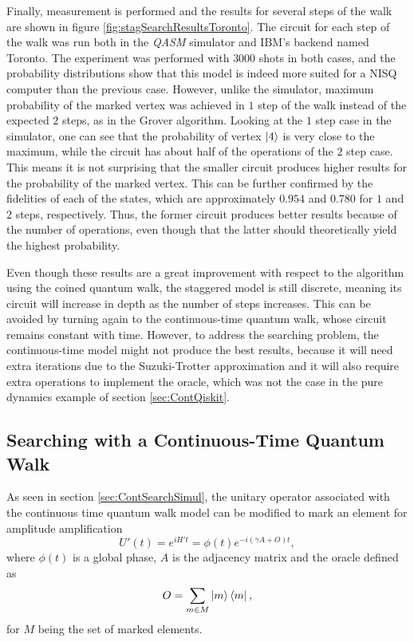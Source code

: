\documentclass[../../dissertation.tex]{subfiles}
\begin{document}
Finally, measurement is performed and the results for several steps of the walk
are shown in figure \ref{fig:stagSearchResultsToronto}.  The circuit for each
step of the walk was run both in the \textit{QASM} simulator and IBM's backend
named Toronto. The experiment was performed with $3000$ shots in both cases,
and the probability distributions show that this model is indeed more suited
for a NISQ computer than the previous case.  However, unlike the simulator,
maximum probability of the marked vertex was achieved in $1$ step of the walk
instead of the expected $2$ steps, as in the Grover algorithm. Looking at the
$1$ step case in the simulator, one can see that the probability of vertex
$\ket{4}$ is very close to the maximum, while the circuit has about half of the
operations of the $2$ step case. This means it is not surprising that the
smaller circuit produces higher results for the probability of the marked
vertex. 
This can be further confirmed by the fidelities of each of the states, which
are approximately $0.954$ and $0.780$ for $1$ and $2$ steps, respectively.
Thus, the former circuit produces better results because of the number of
operations, even though that the latter should theoretically yield the highest
probability.\par 

Even though these results are a great improvement with respect to the algorithm using
the coined quantum walk, the staggered model is still discrete, meaning its
circuit will increase in depth as the number of steps increases. This can be
avoided by turning again to the continuous-time quantum walk, whose circuit
remains constant with time.  However, to address the searching problem, the
continuous-time model might not produce the best results, because it will need extra
iterations due to the Suzuki-Trotter approximation and it will also require
extra operations to implement the oracle, which was not the case in the pure
dynamics example of section \ref{sec:ContQiskit}.

\subsection{Searching with a Continuous-Time Quantum Walk}
As seen in section \ref{sec:ContSearchSimul}, the unitary operator
associated with the continuous time quantum walk model can be modified to
mark an element for amplitude amplification
\begin{equation}
	U'(t) = e^{iH't} = \phi(t)e^{-i(\gamma A+O)t},
	\label{eq:qiskitU'}
\end{equation}
where $\phi(t)$ is a global phase, $A$ is the adjacency matrix and the oracle defined as 
\begin{equation}
	O = \sum_{m \in M} \ket{m}\bra{m},
\end{equation}
for $M$ being the set of marked elements.\par
\end{document}
